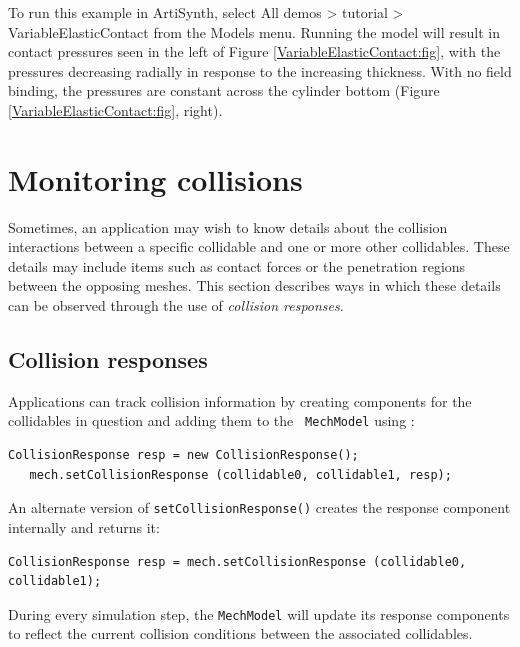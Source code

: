 To run this example in ArtiSynth, select {\sf All demos > tutorial >
VariableElasticContact} from the {\sf Models} menu. Running the model
will result in contact pressures seen in the left of
Figure \ref{VariableElasticContact:fig}, with the pressures decreasing
radially in response to the increasing thickness. With no field
binding, the pressures are constant across the cylinder bottom
(Figure \ref{VariableElasticContact:fig}, right).

\section{Monitoring collisions}
\label{MonitoringCollisions:sec}

Sometimes, an application may wish to know details about the collision
interactions between a specific collidable and one or more other
collidables.  These details may include items such as contact forces
or the penetration regions between the opposing meshes.  This section
describes ways in which these details can be observed through the use
of {\it collision responses}.

\subsection{Collision responses}
\label{collisionResponse:sec}

Applications can track collision information by
creating 
components for the collidables in question and adding them to the {\tt
MechModel} using 
:
%
\begin{lstlisting}[]
   CollisionResponse resp = new CollisionResponse();
   mech.setCollisionResponse (collidable0, collidable1, resp);
\end{lstlisting}
%
An alternate version of {\tt setCollisionResponse()} creates the
response component internally and returns it:
%
\begin{lstlisting}[]
   CollisionResponse resp = mech.setCollisionResponse (collidable0, collidable1);
\end{lstlisting}
%
During every simulation step, the {\tt MechModel} will update its
response components to reflect the current collision conditions
between the associated collidables.

